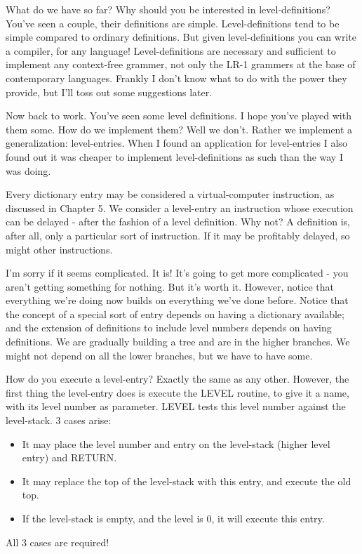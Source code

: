 \documentclass[b5paper, oneside]{book}
\begin{document}
What do we have so far? Why should you be interested in level-definitions? You've seen a couple, their definitions are simple. Level-definitions tend to be simple compared to ordinary definitions. But given level-definitions you can write a compiler, for any language! Level-definitions are necessary and sufficient to implement any context-free grammer, not only the LR-1 grammers at the base of contemporary languages. Frankly I don't know what to do with the power they provide, but I'll toss out some suggestions later.

Now back to work. You've seen some level definitions. I hope you've played with them some. How do we implement them? Well we don't. Rather we implement a generalization: level-entries. When I found an application for level-entries I also found out it was cheaper to implement level-definitions as such than the way I was doing.

Every dictionary entry may be considered a virtual-computer instruction, as discussed in Chapter 5. We consider a level-entry an instruction whose execution can be delayed - after the fashion of a level definition. Why not? A definition is, after all, only a particular sort of instruction. If it may be profitably delayed, so might other instructions.

I'm sorry if it seems complicated. It is! It's going to get more complicated - you aren't getting something for nothing. But it's worth it. However, notice that everything we're doing now builds on everything we've done before. Notice that the concept of a special sort of entry depends on having a dictionary available; and the extension of definitions to include level numbers depends on having definitions. We are gradually building a tree and are in the higher branches. We might not depend on all the lower branches, but we have to have some.

How do you execute a level-entry? Exactly the same as any other. However, the first thing the level-entry does is execute the LEVEL routine, to give it a name, with its level number as parameter. LEVEL tests this level number against the level-stack. 3 cases arise:\begin{itemize}
   \item It may place the level number and entry on the level-stack (higher level entry) and RETURN.
   \item It may replace the top of the level-stack with this entry, and execute the old top.
   \item If the level-stack is empty, and the level is 0, it will execute this entry.\end{itemize}
All 3 cases are required!
\end{document}
